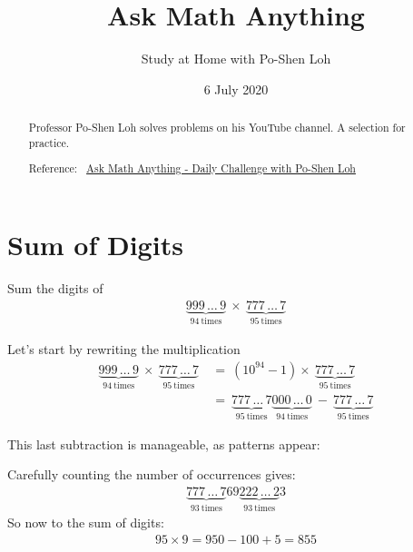 \documentclass[12pt]{article}
\title{Ask Math Anything}
\author{Study at Home with Po-Shen Loh}
\date{6 July 2020}
\begin{document}
\begin{minipage}{\textwidth}
\maketitle
\begin{abstract}
Professor Po-Shen Loh solves problems on his YouTube channel. A selection for practice. 

Reference:~ 
\href{https://www.youtube.com/channel/UCf78EJOm4wQ4xXwSS15PuxQ}{Ask Math Anything - Daily Challenge with Po-Shen Loh}
\end{abstract}
\end{minipage}


\section*{Sum of Digits}
Sum the digits of 
\begin{align*}
\underbrace{999\,\ldots\,9}_{94~\text{times}} ~\times~ \underbrace{777\,\ldots\,7}_{95~\text{times}}
\end{align*}


\begin{answer}
Let's start by rewriting the multiplication
\begin{align*}
\underbrace{999\,\ldots\,9}_{94~\text{times}} ~\times~ \underbrace{777\,\ldots\,7}_{95~\text{times}}~ 
& = ~(10^{94}-1) \times~ \underbrace{777\,\ldots\,7}_{95~\text{times}} \\
& = ~\underbrace{777\,\ldots\,7}_{95~\text{times}} \underbrace{000\,\ldots\,0}_{94~\text{times}} ~-~ \underbrace{777\,\ldots\,7}_{95~\text{times}} 
\end{align*}

This last subtraction is manageable, as patterns appear:
\begin{center}
\qquad
\end{center}
Carefully counting the number of occurrences gives:
\begin{align*} 
\underbrace{777\,\ldots\,7}_{93~\text{times}} 69 \underbrace{222\,\ldots\,2}_{93~\text{times}} 3
\end{align*}
So now to the sum of digits:
\begin{align*} 
95 \times 9 = 950 - 100 + 5 = 855
\end{align*}

\end{answer}
\end{document}
